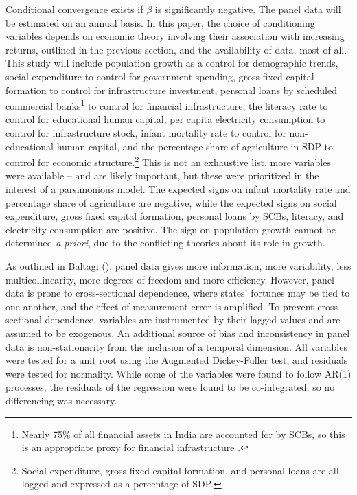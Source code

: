 \documentclass[a4paper, 11pt]{article}
\begin{document}
Conditional convergence exists if $\beta$ is significantly negative.  The panel data will be estimated on an annual basis.  In this paper, the choice of conditioning variables depends on economic theory involving their association with increasing returns, outlined in the previous section, and the availability of data, most of all.  This study will include population growth as a control for demographic trends, social expenditure to control for government spending, gross fixed capital formation to control for infrastructure investment, personal loans by scheduled commercial banks\footnote{Nearly 75\% of all financial assets in India are accounted for by SCBs, so this is an appropriate proxy for financial infrastructure \citep{cherodian_regional_2015}.} to control for financial infrastructure, the literacy rate to control for educational human capital, per capita electricity consumption to control for infrastructure stock, infant mortality rate to control for non-educational human capital, and the percentage share of agriculture in SDP to control for economic structure.\footnote{Social expenditure, gross fixed capital formation, and personal loans are all logged and expressed as a percentage of SDP.}  This is not an exhaustive list, more variables were available -- and are likely important, but these were prioritized in the interest of a parsimonious model.  The expected signs on infant mortality rate and percentage share of agriculture are negative, while the expected signs on social expenditure, gross fixed capital formation, personal loans by SCBs, literacy, and electricity consumption are positive.  The sign on population growth cannot be determined \textit{a priori}, due to the conflicting theories about its role in growth.\par 
As outlined in Baltagi (\citeyear{baltagi_econometric_2008}), panel data gives more information, more variability, less multicollinearity, more degrees of freedom and more efficiency.  However, panel data is prone to cross-sectional dependence, where states’ fortunes may be tied to one another, and the effect of measurement error is amplified.  To prevent cross-sectional dependence, variables are instrumented by their lagged values and are assumed to be exogenous.  An additional source of bias and inconsistency in panel data is non-stationarity from the inclusion of a temporal dimension.  All variables were tested for a unit root using the Augmented Dickey-Fuller test, and residuals were tested for normality.  While some of the variables were found to follow AR(1) processes, the residuals of the regression were found to be co-integrated, so no differencing was necessary.  \par
\end{document}
